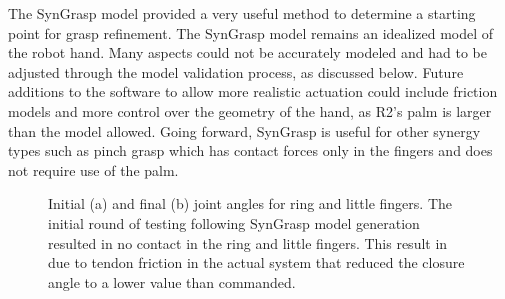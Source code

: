 \documentclass[runningheads,a4paper]{llncs}
\begin{document}
The SynGrasp model provided a very useful method to determine a starting point for grasp refinement. The SynGrasp model remains an idealized model of the robot hand. Many aspects could not be accurately modeled and had to be adjusted through the model validation process, as discussed below. Future additions to the software to allow more realistic actuation could include friction models and more control over the geometry of the hand, as R2's palm is larger than the model allowed. Going forward, SynGrasp is useful for other synergy types such as pinch grasp which has contact forces only in the fingers and does not require use of the palm. 

\begin{figure}[!b]
\centering
\null\hfill
	\quad
	\hfill
	\hfill\null
  \caption{Initial (a) and final (b) joint angles for ring and little fingers. The initial round of testing following SynGrasp model generation resulted in no contact in the ring and little fingers.  This result in due to tendon friction in the actual system that reduced the closure angle to a lower value than commanded.}%
\label{pinkymodels}%
\end{figure}
\end{document}
